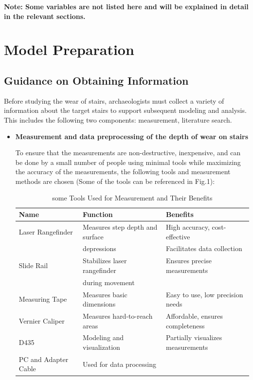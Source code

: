 \documentclass{mcmthesis}
\begin{document}
  \textbf{Note: Some variables are not listed here and will be explained in detail in the relevant sections.}
\section{Model Preparation}
\subsection{Guidance on Obtaining Information}
Before studying the wear of stairs, archaeologists must collect a variety of information about the target stairs to support subsequent modeling and analysis. This includes the following two components: measurement, literature search.



\begin{itemize}[label=$\diamond$]

\item \textbf{Measurement and data preprocessing of the depth of wear on stairs}

To ensure that the measurements are non-destructive, inexpensive, and can be done by a small number of people using minimal tools while maximizing the accuracy of the measurements, the following tools and measurement methods are chosen (Some of the tools can be referenced in Fig.1):

\begin{table}[h!]
  \caption{some Tools Used for Measurement and Their Benefits}
  \begin{tabular}{@{}lll@{}}
  \toprule
  \textbf{Name}          & \textbf{Function}                      & \textbf{Benefits}                \\ \midrule
  Laser Rangefinder      & Measures step depth and surface        & High accuracy, cost-effective     \\
                         & depressions                            & Facilitates data collection       \\
  Slide Rail             & Stabilizes laser rangefinder           & Ensures precise measurements      \\
                         & during movement                        &                                   \\
  Measuring Tape         & Measures basic dimensions              & Easy to use, low precision needs  \\
  Vernier Caliper        & Measures hard-to-reach areas           & Affordable, ensures completeness  \\
  D435                   & Modeling and visualization             & Partially visualizes measurements \\
  PC and Adapter Cable   & Used for data processing               &                                   \\ \bottomrule
  \end{tabular}
  \end{table}
  



\end{itemize}
\end{document}
